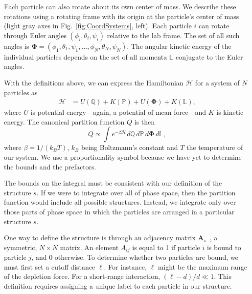 \documentclass[pre, aps, twocolumn, reprint, amsmath,amssymb, showpacs,
superscriptaddress] {revtex4-1}
\begin{document}
Each particle can also rotate about its own center of mass. We describe
these rotations using a rotating frame with its origin at the particle's
center of mass (light gray axes in Fig.~\ref{fig:CoordSystems}, left).
Each particle $i$ can rotate through Euler angles $(\phi_{i},
\theta_{i}, \psi_{i})$ relative to the lab frame. The set of all such
angles is $\bm{\Phi}=(\phi_1, \theta_1, \psi_1, \ldots, \phi_N,
\theta_N, \psi_N)$. The angular kinetic energy of the individual
particles depends on the set of all momenta $\mathbb{L}$ conjugate to
the Euler angles.

With the definitions above, we can express the Hamiltonian $\mathcal{H}$
for a system of $N$ particles as
\begin{equation}\label{Particle-Hamiltonian}
  \begin{split}
    \mathcal{H} &= 
    U(\mathbb{Q}) + K(\mathbb{P}) + U(\bm{\Phi})
    + K(\mathbb{L}),
  \end{split}
\end{equation}
where $U$ is potential energy---again, a potential of mean force---and
$K$ is kinetic energy. The canonical partition function $Q$ is then
\begin{equation}\label{particle_prop_partitionfunction}
  Q \propto \int {e^{-\beta \mathcal{H} } }d\mathbb{Q} \, d\mathbb{P} \, d\bm{\Phi} \, d\mathbb{L},
\end{equation}
where $\beta=1/(k_B T)$, $k_B$ being Boltzmann's constant and $T$ the
temperature of our system. We use a proportionality symbol because we
have yet to determine the bounds and the prefactors.

The bounds on the integral must be consistent with our definition of the
structure $s$. If we were to integrate over all of phase space, then the
partition function would include all possible structures. Instead, we
integrate only over those parts of phase space in which the particles
are arranged in a particular structure $s$.

One way to define the structure is through an adjacency matrix
$\mathbf{A}_s$~\cite{arkus09, arkus_deriving_2011}, a symmetric,
$N\times N$ matrix. An element $A_{ij}$ is equal to 1 if particle $i$ is
bound to particle $j$, and 0 otherwise. To determine whether two
particles are bound, we must first set a cutoff distance $\ell$. For
instance, $\ell$ might be the maximum range of the depletion force. For
a short-range interaction, $(\ell-d)/d \ll 1$. This definition requires
assigning a unique label to each particle in our structure.
\end{document}
